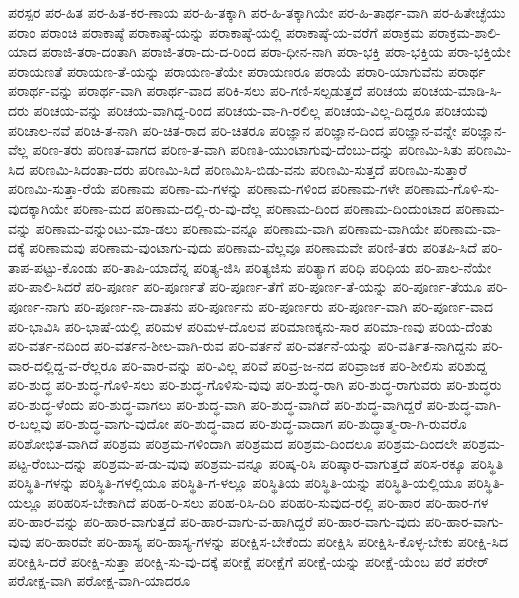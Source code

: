 ಪರಸ್ಪರ
ಪರ-ಹಿತ
ಪರ-ಹಿತ-ಕರ-ಣಾಯ
ಪರ-ಹಿ-ತಕ್ಕಾಗಿ
ಪರ-ಹಿ-ತಕ್ಕಾಗಿಯೇ
ಪರ-ಹಿ-ತಾರ್ಥ-ವಾಗಿ
ಪರ-ಹಿತೇಚ್ಛೆಯು
ಪರಾಂ
ಪರಾಂಚಿ
ಪರಾಕಾಷ್ಠೆ
ಪರಾಕಾಷ್ಠೆ-ಯನ್ನು
ಪರಾಕಾಷ್ಠೆ-ಯಲ್ಲಿ
ಪರಾಕಾಷ್ಠೆ-ಯ-ವರೆಗೆ
ಪರಾಕ್ರಮ
ಪರಾಕ್ರಮ-ಶಾಲಿ-ಯಾದ
ಪರಾಜಿ-ತರಾ-ದಂತಾಗಿ
ಪರಾಜಿ-ತರಾ-ದು-ದ-ರಿಂದ
ಪರಾ-ಧೀನ-ನಾಗಿ
ಪರಾ-ಭಕ್ತಿ
ಪರಾ-ಭಕ್ತಿಯ
ಪರಾ-ಭಕ್ತಿಯೇ
ಪರಾಯಣತೆ
ಪರಾಯಣ-ತೆ-ಯನ್ನು
ಪರಾಯಣ-ತೆಯೇ
ಪರಾಯಣರೂ
ಪರಾಯೆ
ಪರಾರಿ-ಯಾಗುವೆನು
ಪರಾರ್ಥ
ಪರಾರ್ಥ-ವನ್ನು
ಪರಾರ್ಥ-ವಾಗಿ
ಪರಾರ್ಥ-ವಾದ
ಪರಿಕಿ-ಸಲು
ಪರಿ-ಗಣಿ-ಸಲ್ಪಡುತ್ತದೆ
ಪರಿಚಯ
ಪರಿಚಯ-ಮಾಡಿ-ಸಿ-ದರು
ಪರಿಚಯ-ವನ್ನು
ಪರಿಚಯ-ವಾಗಿದ್ದ-ರಿಂದ
ಪರಿಚಯ-ವಾ-ಗಿ-ರಲಿಲ್ಲ
ಪರಿಚಯ-ವಿಲ್ಲ-ದಿದ್ದರೂ
ಪರಿಚಯವು
ಪರಿಚಾಲ-ನವೆ
ಪರಿಚಿ-ತ-ನಾಗಿ
ಪರಿ-ಚಿತ-ರಾದ
ಪರಿ-ಚಿತರೂ
ಪರಿಜ್ಞಾನ
ಪರಿಜ್ಞಾನ-ದಿಂದ
ಪರಿಜ್ಞಾನ-ವನ್ನೇ
ಪರಿಜ್ಞಾನ-ವೆಲ್ಲ
ಪರಿಣ-ತರು
ಪರಿಣತ-ವಾಗದ
ಪರಿಣ-ತ-ವಾಗಿ
ಪರಿಣತಿ-ಯುಂಟಾಗುವು-ದೆಂಬು-ದನ್ನು
ಪರಿಣಮಿ-ಸಿತು
ಪರಿಣಮಿ-ಸಿದ
ಪರಿಣಮಿ-ಸಿದಂತಾ-ದರು
ಪರಿಣಮಿ-ಸಿದೆ
ಪರಿಣಮಿಸಿ-ಬಿಡು-ವನು
ಪರಿಣಮಿ-ಸುತ್ತದೆ
ಪರಿಣಮಿ-ಸುತ್ತಾರೆ
ಪರಿಣಮಿ-ಸುತ್ತಾ-ರೆಯೆ
ಪರಿಣಾಮ
ಪರಿಣಾ-ಮ-ಗಳನ್ನು
ಪರಿಣಾಮ-ಗಳಿಂದ
ಪರಿಣಾಮ-ಗಳೇ
ಪರಿಣಾಮ-ಗೊಳಿ-ಸು-ವುದಕ್ಕಾಗಿಯೇ
ಪರಿಣಾ-ಮದ
ಪರಿಣಾಮ-ದಲ್ಲಿ-ರು-ವು-ದೆಲ್ಲ
ಪರಿಣಾಮ-ದಿಂದ
ಪರಿಣಾಮ-ದಿಂದುಂಟಾದ
ಪರಿಣಾಮ-ವನ್ನು
ಪರಿಣಾಮ-ವನ್ನುಂಟು-ಮಾ-ಡಲು
ಪರಿಣಾಮ-ವನ್ನೂ
ಪರಿಣಾಮ-ವಾಗಿ
ಪರಿಣಾಮ-ವಾಗಿಯೇ
ಪರಿಣಾಮ-ವಾ-ದಕ್ಕೆ
ಪರಿಣಾಮವು
ಪರಿಣಾಮ-ವುಂಟಾಗು-ವುದು
ಪರಿಣಾಮ-ವೆಲ್ಲವೂ
ಪರಿಣಾಮವೇ
ಪರಿಣಿ-ತರು
ಪರಿತಪಿ-ಸಿದೆ
ಪರಿ-ತಾಪ-ಪಟ್ಟು-ಕೊಂಡು
ಪರಿ-ತಾಪಿ-ಯಾದೆನ್ನ
ಪರಿತ್ಯ-ಜಿಸಿ
ಪರಿತ್ಯಜಿಸು
ಪರಿತ್ಯಾಗ
ಪರಿಧಿ
ಪರಿಧಿಯ
ಪರಿ-ಪಾಲ-ನೆಯೇ
ಪರಿ-ಪಾಲಿ-ಸಿದರೆ
ಪರಿ-ಪೂರ್ಣ
ಪರಿ-ಪೂರ್ಣತೆ
ಪರಿ-ಪೂರ್ಣ-ತೆಗೆ
ಪರಿ-ಪೂರ್ಣ-ತೆ-ಯನ್ನು
ಪರಿ-ಪೂರ್ಣ-ತೆಯೂ
ಪರಿ-ಪೂರ್ಣ-ನಾಗು
ಪರಿ-ಪೂರ್ಣ-ನಾ-ದಾತನು
ಪರಿ-ಪೂರ್ಣನು
ಪರಿ-ಪೂರ್ಣರು
ಪರಿ-ಪೂರ್ಣ-ವಾಗಿ
ಪರಿ-ಪೂರ್ಣ-ವಾದ
ಪರಿ-ಭಾವಿಸಿ
ಪರಿ-ಭಾಷೆ-ಯಲ್ಲಿ
ಪರಿಮಳ
ಪರಿಮಳ-ದೊಲವ
ಪರಿಮಾಣಕ್ಕನು-ಸಾರ
ಪರಿಮಾ-ಣವು
ಪರಿಯ-ದೆಂತು
ಪರಿ-ವರ್ತ-ನದಿಂದ
ಪರಿ-ವರ್ತನ-ಶೀಲ-ವಾಗಿ-ರುವ
ಪರಿ-ವರ್ತನೆ
ಪರಿ-ವರ್ತನೆ-ಯನ್ನು
ಪರಿ-ವರ್ತಿತ-ನಾಗಿದ್ದನು
ಪರಿ-ವಾರ-ದಲ್ಲಿದ್ದ-ವ-ರೆಲ್ಲರೂ
ಪರಿ-ವಾರ-ವನ್ನು
ಪರಿ-ವಿಲ್ಲ
ಪರಿವೆ
ಪರಿವ್ರ-ಜ-ನದ
ಪರಿವ್ರಾಜಕ
ಪರಿ-ಶೀಲಿಸು
ಪರಿಶುದ್ದ
ಪರಿ-ಶುದ್ಧ
ಪರಿ-ಶುದ್ಧ-ಗೊಳಿ-ಸಲು
ಪರಿ-ಶುದ್ಧ-ಗೊಳಿಸು-ವುವು
ಪರಿ-ಶುದ್ಧ-ರಾಗಿ
ಪರಿ-ಶುದ್ಧ-ರಾಗುವರು
ಪರಿ-ಶುದ್ಧರು
ಪರಿ-ಶುದ್ಧ-ಳೆಂದು
ಪರಿ-ಶುದ್ಧ-ವಾಗಲು
ಪರಿ-ಶುದ್ಧ-ವಾಗಿ
ಪರಿ-ಶುದ್ಧ-ವಾಗಿದೆ
ಪರಿ-ಶುದ್ಧ-ವಾಗಿದ್ದರೆ
ಪರಿ-ಶುದ್ಧ-ವಾಗಿ-ರ-ಬಲ್ಲವು
ಪರಿ-ಶುದ್ಧ-ವಾಗು-ವುದೋ
ಪರಿ-ಶುದ್ಧ-ವಾದ
ಪರಿ-ಶುದ್ಧ-ವಾದಾಗ
ಪರಿ-ಶುದ್ಧಾತ್ಮ-ರಾ-ಗಿ-ರುವರೊ
ಪರಿಶೋಭಿತ-ವಾಗಿದೆ
ಪರಿಶ್ರಮ
ಪರಿಶ್ರಮ-ಗಳಿಂದಾಗಿ
ಪರಿಶ್ರಮದ
ಪರಿಶ್ರಮ-ದಿಂದಲೂ
ಪರಿಶ್ರಮ-ದಿಂದಲೇ
ಪರಿಶ್ರಮ-ಪಟ್ಟ-ರೆಂಬು-ದನ್ನು
ಪರಿಶ್ರಮ-ಪ-ಡು-ವುವು
ಪರಿಶ್ರಮ-ವನ್ನೂ
ಪರಿಷ್ಕ-ರಿಸಿ
ಪರಿಷ್ಕಾರ-ವಾಗುತ್ತದೆ
ಪರಿಸ-ರಕ್ಕೂ
ಪರಿಸ್ಥಿತಿ
ಪರಿಸ್ಥಿತಿ-ಗಳನ್ನು
ಪರಿಸ್ಥಿತಿ-ಗಳಲ್ಲಿಯೂ
ಪರಿಸ್ಥಿತಿ-ಗ-ಳಲ್ಲೂ
ಪರಿಸ್ಥಿತಿಯ
ಪರಿಸ್ಥಿತಿ-ಯನ್ನು
ಪರಿಸ್ಥಿತಿ-ಯಲ್ಲಿಯೂ
ಪರಿಸ್ಥಿತಿ-ಯಲ್ಲೂ
ಪರಿಹರಿಸ-ಬೇಕಾಗಿದೆ
ಪರಿಹ-ರಿ-ಸಲು
ಪರಿಹ-ರಿಸಿ-ದಿರಿ
ಪರಿಹರಿ-ಸುವುದ-ರಲ್ಲಿ
ಪರಿ-ಹಾರ
ಪರಿ-ಹಾರ-ಗಳ
ಪರಿ-ಹಾರ-ವನ್ನು
ಪರಿ-ಹಾರ-ವಾಗುತ್ತದೆ
ಪರಿ-ಹಾರ-ವಾಗು-ವ-ಹಾಗಿದ್ದರೆ
ಪರಿ-ಹಾರ-ವಾಗು-ವುದು
ಪರಿ-ಹಾರ-ವಾಗು-ವುವು
ಪರಿ-ಹಾರವೇ
ಪರಿ-ಹಾಸ್ಯ
ಪರಿ-ಹಾಸ್ಯ-ಗಳನ್ನು
ಪರೀಕ್ಷಿಸ-ಬೇಕೆಂದು
ಪರೀಕ್ಷಿಸಿ
ಪರೀಕ್ಷಿಸಿ-ಕೊಳ್ಳ-ಬೇಕು
ಪರೀಕ್ಷಿ-ಸಿದ
ಪರೀಕ್ಷಿಸಿ-ದರೆ
ಪರೀಕ್ಷಿ-ಸುತ್ತಾ
ಪರೀಕ್ಷಿ-ಸು-ವು-ದಕ್ಕೆ
ಪರೀಕ್ಷೆ
ಪರೀಕ್ಷೆಗೆ
ಪರೀಕ್ಷೆ-ಯನ್ನು
ಪರೀಕ್ಷೆ-ಯೆಂಬ
ಪರೆ
ಪರೇರ್
ಪರೋಕ್ಷ-ವಾಗಿ
ಪರೋಕ್ಷ-ವಾಗಿ-ಯಾದರೂ
